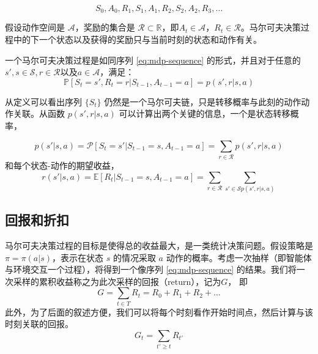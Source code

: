 \begin{equation}
    S_0, A_0, R_1, S_1, A_1, R_2, S_2, A_2, R_3,\dots
    \label{eq:mdp-sequence}
\end{equation}

假设动作空间是 $\mathcal{A}$，奖励的集合是 $\mathcal{R} \subset \mathbb{R}$，即$A_t \in \mathcal{A}$，$R_t \in \mathcal{R}$。马尔可夫决策过程中的下一个状态以及获得的奖励只与当前时刻的状态和动作有关。

\begin{definition}[马尔可夫决策过程]
    一个马尔可夫决策过程是如同序列 \ref{eq:mdp-sequence} 的形式，并且对于任意的$s', s \in \mathcal{S}, r \in \mathcal{R} \text{以及} a\in \mathcal{A}$，满足：
    \begin{equation}
        \mathbb{P}[S_t = s', R_t = r| S_{t-1}, A_{t-1} = a] = p(s', r | s, a)
        \label{def:mdp}
    \end{equation}
\end{definition}

从定义可以看出序列 $\{S_t\}$ 仍然是一个马尔可夫链，只是转移概率与此刻的动作动作关联。从函数 $p(s', r|s, a)$ 可以计算出两个关键的信息，一个是状态转移概率，

\begin{equation}
    p(s'|s, a) = \mathcal{P}[S_t = s' | S_{t-1} = s, A_{t-1} = a] = \sum_{r\in \mathcal{R}} p(s', r|s, a)
\end{equation}
和每个状态-动作的期望收益，
\begin{equation}
    r(s' | s, a) = \mathbb{E} [R_t | S_{t-1} = s, A_{t-1} = a] = \sum_{r\in \mathcal{R}} \sum_{s' \in \mathcal{S} p(s', r | s, a)}
\end{equation}


\subsection{回报和折扣}
马尔可夫决策过程的目标是使得总的收益最大，是一类统计决策问题。假设策略是 $\pi = \pi(a | s)$，表示在状态 $s$ 的情况采取 $a$ 动作的概率。考虑一次抽样（即智能体与环境交互一个过程），将得到一个像序列 \ref{eq:mdp-sequence} 的结果。我们将一次采样的累积收益称之为此次采样的回报（return），记为$G$， 即
\begin{equation}
    G = \sum_{t \in T} R_t = R_0 + R_1 + R_2 + \dots
\end{equation}
此外，为了后面的叙述方便，我们可以将每个时刻看作开始时间点，然后计算与该时刻关联的回报。
\begin{equation}
    G_t = \sum_{t' \geq t} R_{t'}
\end{equation}

